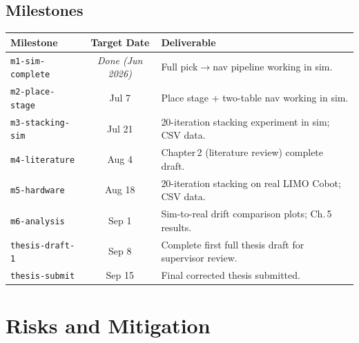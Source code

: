 \documentclass[11pt,a4paper]{article}
\begin{document}
\vspace{0.5em}

\subsection{Milestones}
\begin{table}[h]
\centering
\small
\begin{tabularx}{\textwidth}{l c X}
\toprule
\textbf{Milestone} & \textbf{Target Date} & \textbf{Deliverable} \\
\midrule
\texttt{m1-sim-complete} & \emph{Done (Jun 2026)} & Full pick$\to$nav pipeline working in sim. \\
\texttt{m2-place-stage} & Jul 7 & Place stage + two-table nav working in sim. \\
\texttt{m3-stacking-sim} & Jul 21 & 20-iteration stacking experiment in sim; CSV data. \\
\texttt{m4-literature} & Aug 4 & Chapter\,2 (literature review) complete draft. \\
\texttt{m5-hardware} & Aug 18 & 20-iteration stacking on real LIMO Cobot; CSV data. \\
\texttt{m6-analysis} & Sep 1 & Sim-to-real drift comparison plots; Ch.\,5 results. \\
\texttt{thesis-draft-1} & Sep 8 & Complete first full thesis draft for supervisor review. \\
\texttt{thesis-submit} & Sep 15 & Final corrected thesis submitted. \\
\bottomrule
\end{tabularx}
\end{table}

\newpage

\section{Risks and Mitigation}
\end{document}
